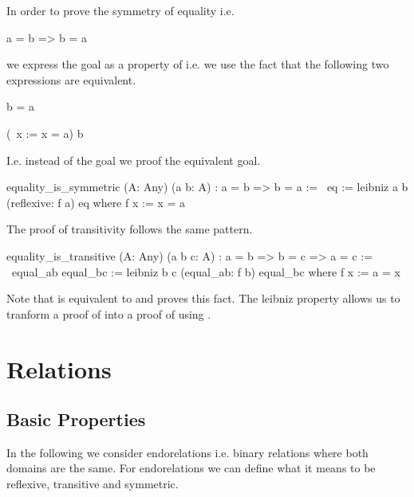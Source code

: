 In order to prove the symmetry of equality i.e.

\begin{alba}
    a = b  =>  b = a
\end{alba}

we express the goal  as a property of  i.e. we use the fact
that the following two expressions are equivalent.

\begin{alba}
    b = a

    (\ x := x = a) b
\end{alba}

I.e. instead of the goal  we proof the equivalent goal.


\begin{alba}
    equality_is_symmetric
        (A: Any)
        (a b: A)
        : a = b => b = a
    :=
        \ eq
        :=
            leibniz a b (reflexive: f a) eq
        where
            f x := x = a
\end{alba}

The proof of transitivity follows the same pattern.

\begin{alba}
    equality_is_transitive
        (A: Any) (a b c: A)
        : a = b => b = c => a = c
    :=
        \ equal_ab equal_bc
        :=
            leibniz b c (equal_ab: f b) equal_bc
        where
            f x := a = x
\end{alba}

Note that  is equivalent to  and  proves
this fact. The leibniz property allows us to tranform a proof of  into
a proof of  using .






\newpage


\section{Relations}
\label{sec:certprog-relations}


\subsection{Basic Properties}


In the following we consider endorelations i.e. binary relations where both
domains are the same. For endorelations we can define what it means to be
reflexive, transitive and symmetric.

